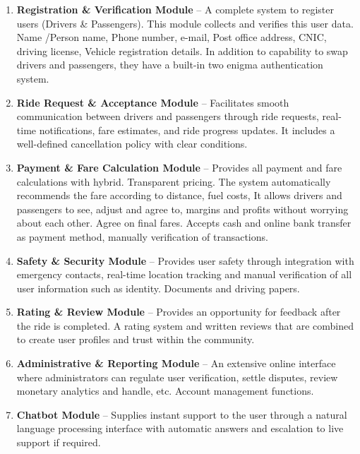 \begin{enumerate}
    \item \textbf{Registration \& Verification Module} – A complete system to register users (Drivers \& Passengers). This module collects and verifies this user data. Name /Person name, Phone number, e-mail, Post office address, CNIC, driving license, Vehicle registration details. In addition to capability to swap drivers and passengers, they have a built-in two enigma authentication system.

    \item \textbf{Ride Request \& Acceptance Module} – Facilitates smooth communication between drivers and passengers through ride requests, real-time notifications, fare estimates, and ride progress updates. It includes a well-defined cancellation policy with clear conditions.
    
    \item \textbf{Payment \& Fare Calculation Module} – Provides all payment and fare calculations with hybrid. Transparent pricing. The system automatically recommends the fare according to distance, fuel costs, It allows drivers and passengers to see, adjust and agree to, margins and profits without worrying about each other. Agree on final fares. Accepts cash and online bank transfer as payment method, manually verification of transactions.
    
    \item \textbf{Safety \& Security Module} – Provides user safety through integration with emergency contacts, real-time location tracking and manual verification of all user information such as identity. Documents and driving papers.
    
    \item \textbf{Rating \& Review Module} – Provides an opportunity for feedback after the ride is completed. A rating system and written reviews that are combined to create user profiles and trust within the community.
    
    \item \textbf{Administrative \& Reporting Module} – An extensive online interface where administrators can regulate user verification, settle disputes, review monetary analytics and handle, etc. Account management functions.
    
    \item \textbf{Chatbot Module} – Supplies instant support to the user through a natural language processing interface with automatic answers and escalation to live support if required.
    

\end{enumerate}
